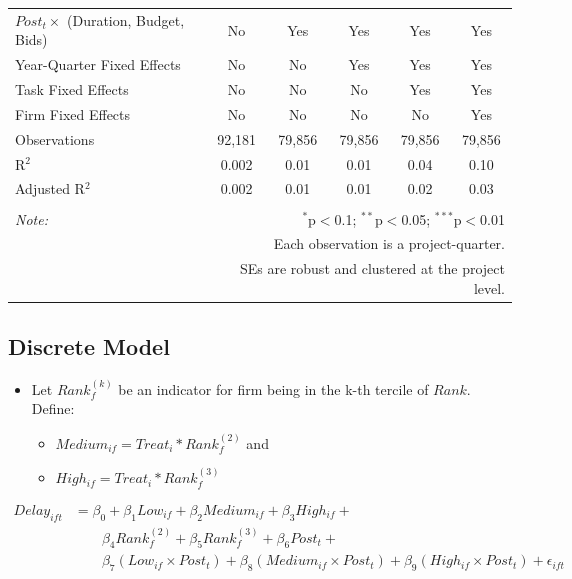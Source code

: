 \documentclass[]{article}
\providecommand{\tightlist}{%
  \setlength{\itemsep}{0pt}\setlength{\parskip}{0pt}}
\begin{document}
\begin{table}[H]
\begin{tabular}{@{\extracolsep{-2pt}}lccccc}
$Post_t \times$  (Duration, Budget, Bids) & No & Yes & Yes & Yes & Yes \\ 
Year-Quarter Fixed Effects & No & No & Yes & Yes & Yes \\ 
Task Fixed Effects & No & No & No & Yes & Yes \\ 
Firm Fixed Effects & No & No & No & No & Yes \\ 
Observations & 92,181 & 79,856 & 79,856 & 79,856 & 79,856 \\ 
R$^{2}$ & 0.002 & 0.01 & 0.01 & 0.04 & 0.10 \\ 
Adjusted R$^{2}$ & 0.002 & 0.01 & 0.01 & 0.02 & 0.03 \\ 
\hline 
\hline \\[-1.8ex] 
\textit{Note:}  & \multicolumn{5}{r}{$^{*}$p$<$0.1; $^{**}$p$<$0.05; $^{***}$p$<$0.01} \\ 
 & \multicolumn{5}{r}{Each observation is a project-quarter.} \\ 
 & \multicolumn{5}{r}{SEs are robust and clustered at the project level.} \\ 
\end{tabular} 
\end{table}

\hypertarget{discrete-model}{%
\subsection{Discrete Model}\label{discrete-model}}

\begin{itemize}
\tightlist
\item
  Let \(Rank_f^{(k)}\) be an indicator for firm being in the k-th
  tercile of \(Rank\). Define:

  \begin{itemize}
  \tightlist
  \item
    \(Medium_{if}=Treat_i*Rank_f^{(2)}\) and
  \item
    \(High_{if} = Treat_i*Rank_f^{(3)}\)
  \end{itemize}
\end{itemize}

\[\begin{aligned} Delay_{ift} &= \beta_0+\beta_1 Low_{if}+\beta_2 Medium_{if}+\beta_3 High_{if} +\\  & \qquad  \beta_4 Rank_f^{(2)} + \beta_5 Rank_f^{(3)}+ \beta_6 Post_t + \\& \qquad \beta_7 (Low_{if} \times Post_t) + \beta_8 (Medium_{if} \times Post_t) + \beta_9 (High_{if} \times Post_t) + \epsilon_{ift} \end{aligned}\]
\end{document}
